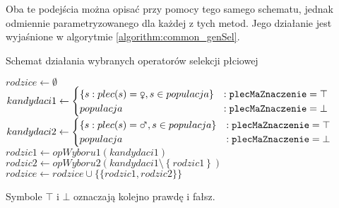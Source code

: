 \documentclass[./FM_mgr.tex]{subfiles}
\begin{document}
Oba te podejścia można opisać przy pomocy tego samego schematu, jednak odmiennie parametryzowanego dla każdej z tych metod. Jego działanie jest wyjaśnione w algorytmie \ref{algorithm:common_genSel}.

\begin{algorithm}
	\caption{Schemat działania wybranych operatorów selekcji płciowej \label{algorithm:common_genSel} }
	\begin{algorithmic}[1]
		\Start
		\Var $rodzice \gets \emptyset$
		\label{line:stdGenSelChoose_init_parent}
		\Var $kandydaci1 \gets \begin{cases} 
		\left\{ s: plec(s)=\female, s \in populacja \right\} &: \param{plecMaZnaczenie}=\top\\ 
		populacja &: \param{plecMaZnaczenie}=\bot
		\end{cases} $
		\label{line:stdGenSelChoose_init_candidates_begin}
		\Var $kandydaci2 \gets \begin{cases} 
		\left\{ s: plec(s)=\male, s \in populacja \right\} &: \param{plecMaZnaczenie}=\top\\ 
		populacja &: \param{plecMaZnaczenie}=\bot
		\end{cases} $
		\label{line:stdGenSelChoose_init_candidates_end}
		\label{line:stdGenSelChoose_while}
		\Var $rodzic1 \gets opWyboru1(kandydaci1) $
		\label{line:stdGenSelChoose_choose_begin}
		\Var $rodzic2 \gets opWyboru2(kandydaci1 \setminus \left\{ rodzic1 \right\}) $
		\label{line:stdGenSelChoose_choose_end}
		\State $rodzice \gets rodzice \cup \{  \{ rodzic1, rodzic2 \} \}$
		\label{line:stdGenSelChoose_parents_merge}
		\EndWhile
		\State {}
		\label{line:stdGenSelChoose_return}
		\EndOperator
	\end{algorithmic}
	Symbole $\top$ i $\bot$ oznaczają kolejno prawdę i fałsz.
\end{algorithm}
\end{document}
